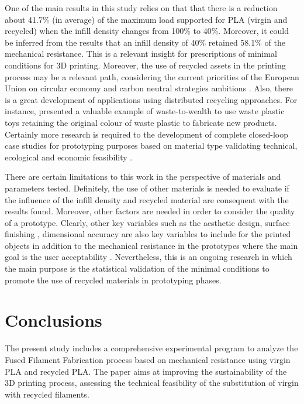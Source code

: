 \documentclass[]{interact}
\theoremstyle{plain}%
\theoremstyle{definition}
\theoremstyle{remark}
\begin{document}
One of the main results in this study relies on that that there is a
reduction about 41.7\% (in average) of the maximum load supported for
PLA (virgin and recycled) when the infill density changes from 100\% to
40\%. Moreover, it could be inferred from the results that an infill
density of 40\% retained 58.1\% of the mechanical resistance. This is a
relevant insight for prescriptions of minimal conditions for 3D
printing. Moreover, the use of recycled assets in the printing process
may be a relevant path, considering the current priorities of the
European Union on circular economy and carbon neutral strategies
ambitions \citep{Schwarz2021}. Also, there is a great development of
applications using distributed recycling approaches. For instance,
\citet{Nur-A-Tomal2020} presented a valuable example of waste-to-wealth
to use waste plastic toys retaining the original colour of waste plastic
to fabricate new products. Certainly more research is required to the
development of complete closed-loop case studies for prototyping
purposes based on material type validating technical, ecological and
economic feasibility \citep{CruzSanchez2020, Sauerwein2019}.

There are certain limitations to this work in the perspective of
materials and parameters tested. Definitely, the use of other materials
is needed to evaluate if the influence of the infill density and
recycled material are consequent with the results found. Moreover, other
factors are needed in order to consider the quality of a prototype.
Clearly, other key variables such as the aesthetic design, surface
finishing \citep{Jin2017}, dimensional accuracy are also key variables
to include for the printed objects in addition to the mechanical
resistance in the prototypes where the main goal is the user
acceptability \citep{Sauer2009, Sauer2010}. Nevertheless, this is an
ongoing research in which the main purpose is the statistical validation
of the minimal conditions to promote the use of recycled materials in
prototyping phases.

\hypertarget{conclusions}{%
\section{Conclusions}\label{conclusions}}

\label{section:conclusions}

The present study includes a comprehensive experimental program to
analyze the Fused Filament Fabrication process based on mechanical
resistance using virgin PLA and recycled PLA. The paper aims at
improving the sustainability of the 3D printing process, assessing the
technical feasibility of the substitution of virgin with recycled
filaments.
\end{document}

